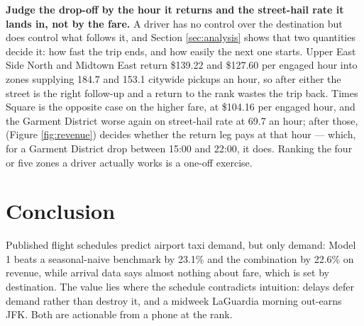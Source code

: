 \documentclass[11pt]{article}
\begin{document}
\textbf{Judge the drop-off by the hour it returns and the street-hail rate it
lands in, not by the fare.} A driver has no control over the destination but
does control what follows it, and Section \ref{sec:analysis} shows that two
quantities decide it: how fast the trip ends, and how easily the next one
starts. Upper East Side North and
Midtown East return \$139.22 and \$127.60 per engaged hour into zones supplying
184.7 and 153.1 citywide pickups an hour, so after either the street is the right
follow-up and a return to the rank wastes the trip back. Times Square is the
opposite case on the higher fare, at \$104.16 per engaged hour, and the Garment
District worse again on street-hail rate at 69.7 an hour; after those, (Figure
\ref{fig:revenue}) decides whether the return leg pays at that hour --- which,
for a Garment District drop between 15:00 and 22:00, it does. Ranking the four or
five zones a driver actually works is a one-off exercise.
 
\section{Conclusion}
 
{
Published flight schedules predict airport taxi demand, but only demand: Model 1
beats a seasonal-naive benchmark by 23.1\% and the combination by 22.6\% on
revenue, while arrival data says almost nothing about fare, which is set by
destination. The value lies where the schedule contradicts intuition: delays
defer demand rather than destroy it, and a midweek LaGuardia morning out-earns
JFK. Both are actionable from a phone at the rank.\par}
 
\printbibliography
 
\end{document}
